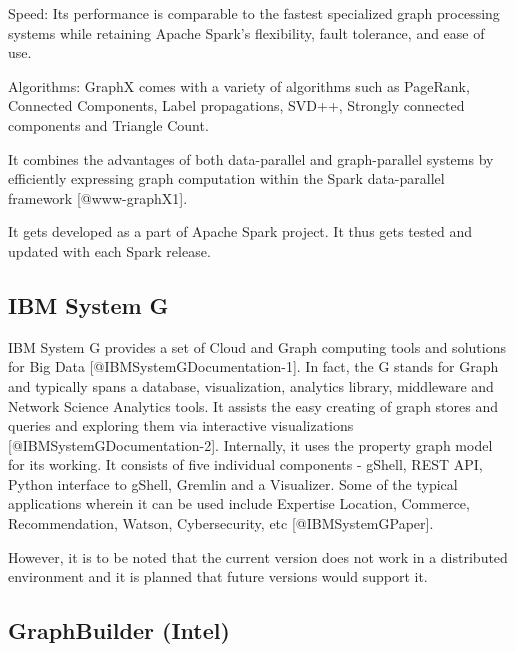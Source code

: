     Speed: Its performance is comparable to the fastest specialized
    graph processing systems while retaining Apache Spark's
    flexibility, fault tolerance, and ease of use.
    
    Algorithms: GraphX comes with a variety of algorithms such as
    PageRank, Connected Components, Label propagations, SVD++,
    Strongly connected components and Triangle Count.

    It combines the advantages of both data-parallel and
    graph-parallel systems by efficiently expressing graph computation
    within the Spark data-parallel framework [@www-graphX1].

    It gets developed as a part of Apache Spark project. It thus gets
    tested and updated with each Spark release.
    
\subsection{IBM System G}

IBM System G provides a set of Cloud and Graph computing tools and
solutions for Big Data [@IBMSystemGDocumentation-1].  In fact, the
G stands for Graph and typically spans a database, visualization,
analytics library, middleware and Network Science Analytics tools.  It
assists the easy creating of graph stores and queries and exploring
them via interactive visualizations [@IBMSystemGDocumentation-2].
Internally, it uses the property graph model for its working.  It
consists of five individual components - gShell, REST API, Python
interface to gShell, Gremlin and a Visualizer.  Some of the typical
applications wherein it can be used include Expertise Location,
Commerce, Recommendation, Watson, Cybersecurity,
etc [@IBMSystemGPaper].

    However, it is to be noted that the current version does not work
    in a distributed environment and it is planned that future
    versions would support it.
    
\subsection{GraphBuilder (Intel)}

